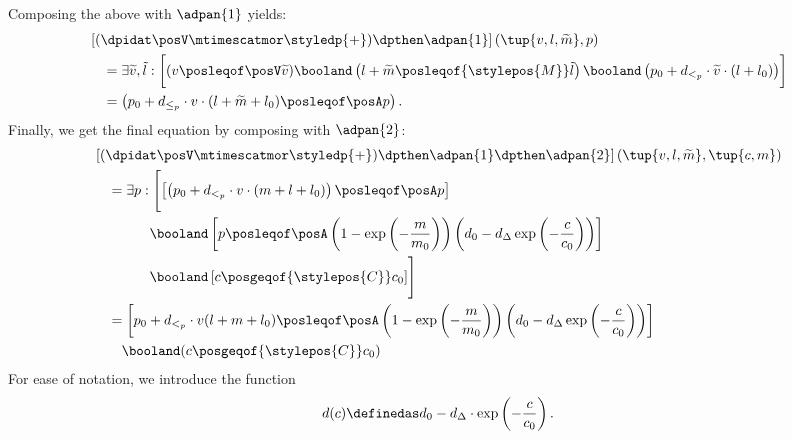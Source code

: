 {\begin{example}
    Composing the above with $\adpan{1}$ yields:  
    \begin{align}
        &\left[(\dpidat\posV \mtimescatmor \styledp{+})\dpthen \adpan{1}\right]\left(\tup{v, l , \widetilde{m}}, p\right) \notag\\
        & \quad = \exists \widetilde{v}, \tilde{l}:\bigg[(v \posleqof\posV \widetilde{v})\booland\left(l + \widetilde{m} \posleqof{\stylepos{M}} \tilde{l} \right) \booland\left(p_0 + d_{<_p} \cdot \widetilde{v} \cdot (l + l_0) \right)\biggr]\\
        &\quad = \left(p_0 + d_{\le_p} \cdot v \cdot (l + \widetilde{m} + l_0) \posleqof\posA  p\right)
    .\end{align} 
    Finally, we get the final equation by composing with $\adpan{2}$: 
    \begin{alignat}{2}
        & \left[(\dpidat\posV \mtimescatmor \styledp{+})\dpthen \adpan{1} \dpthen \adpan{2}\right] \left( \tup{v, l,\widetilde{m}}, \tup{c,m}\right) \\
        &\quad  = \exists p : \Biggl[\left[\left( p_0 + d_{<_p} \cdot v \cdot(m + l + l_0) \right) \posleqof\posA p\right] \notag \\
        & \qquad\qquad\booland  \left[ p \posleqof\posA \left(1 - \exp\left(-\frac{m}{m_0}\right)\right)\left(d_0 - d_\Delta \exp\left(-\frac{c}{c_0}\right)\right)\right] \notag \\
        & \qquad\qquad \booland \left[ c \posgeqof{\stylepos{C}} c_0\right]\Biggr]\\
        & \quad = \left[p_0 + d_{<_p}\cdot v (l + m + l_0) \posleqof\posA \left(1 - \exp\left(-\frac{m}{m_0}\right)\right) \left(d_0 - d_\Delta \exp\left( - \frac{c}{c_0}\right)\right)\right] \notag \\
        & \qquad \booland (c \posgeqof{\stylepos{C}}c_0)
    \end{alignat}
    For ease of notation, we introduce the function
    \begin{equation}
        d(c) \definedas d_0 - d_\Delta \cdot \exp\left(-\frac{c}{c_0}\right)
    .\end{equation}
  


\end{example}}
